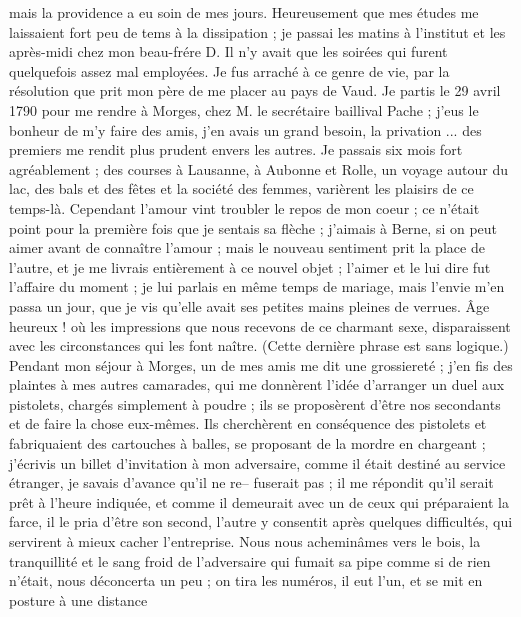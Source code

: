 \documentclass[12pt]{article}
\begin{document}
 mais la providence a eu soin de mes jours. Heureusement
que mes études me laissaient fort peu de tems à la dissipation ; je passai les matins à l’institut
et les après-midi chez mon beau-frére D. Il n’y avait que les soirées qui furent quelquefois assez
mal employées. Je fus arraché à ce genre de vie, par la résolution que prit mon père de me placer au
pays de Vaud. Je partis le 29 avril 1790 pour me rendre à Morges, chez M. le secrétaire baillival
Pache ; j’eus le bonheur de m’y faire des amis, j’en avais un grand besoin, la privation ... des
premiers me rendit plus prudent envers les autres. Je passais six mois fort agréablement ; des
courses à Lausanne, à Aubonne et Rolle, un voyage autour du lac, des bals et des fêtes et la société
des femmes, varièrent les plaisirs de ce temps-là. Cependant l’amour vint troubler le repos de mon
coeur ; ce n’était point pour la première fois que je sentais sa flèche ; j’aimais à Berne, si on
peut aimer avant de connaître l’amour ; mais le nouveau sentiment prit la place de l’autre, et je me
livrais entièrement à ce nouvel objet ; l’aimer et le lui dire fut l’affaire du moment ; je lui
parlais en même temps de mariage, mais l’envie m’en passa un jour, que je vis qu’elle avait ses
petites mains pleines de verrues. Âge heureux ! où les impressions que nous recevons de ce charmant
sexe, disparaissent avec les circonstances qui les font naître. (Cette dernière phrase est sans
logique.) Pendant mon séjour à Morges, un de mes amis me dit une grossiereté ; j’en fis des plaintes
à mes autres camarades, qui me donnèrent l’idée d’arranger un duel aux pistolets, chargés simplement
à poudre ; ils se proposèrent d’être nos secondants et de faire la chose eux-mêmes. Ils cherchèrent
en conséquence des pistolets et fabriquaient des cartouches à balles, se proposant de la mordre en
chargeant ; j’écrivis un billet d’invitation à mon adversaire, comme il était destiné au service
étranger, je savais d’avance qu’il ne re– fuserait pas ; il me répondit qu’il serait prêt à l’heure
indiquée, et comme il demeurait avec un de ceux qui préparaient la farce, il le pria d’être son
second, l’autre y consentit après quelques difficultés, qui servirent à mieux cacher l’entreprise.
Nous nous acheminâmes vers le bois, la tranquillité et le sang froid de l’adversaire qui fumait sa
pipe comme si de rien n’était, nous déconcerta un peu ; on tira les numéros, il eut l’un, et se mit
en posture à une distance
\end{document}
